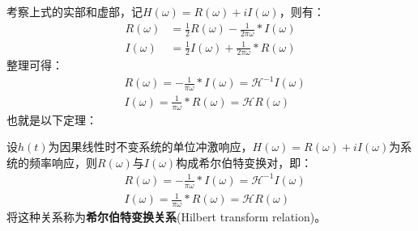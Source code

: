 考察上式的实部和虚部，记$H(\omega)=R(\omega)+iI(\omega)$，则有：
\begin{align*}
    R(\omega)&=\frac{1}{2}R(\omega)-\frac{1}{2\pi \omega}*I(\omega)\\
    I(\omega)&=\frac{1}{2}I(\omega)+\frac{1}{2\pi \omega}*R(\omega)
\end{align*}
整理可得：
\begin{align*}
    &R(\omega)=-\frac{1}{\pi \omega}*I(\omega)=\mathcal{H} ^{-1}I(\omega)\\
    &I(\omega)=\frac{1}{\pi \omega}*R(\omega)=\mathcal{H} R(\omega)
\end{align*}
也就是以下定理：
\begin{theorem}[希尔伯特变换关系]
    设$h(t)$为因果线性时不变系统的单位冲激响应，$H(\omega)=R(\omega)+iI(\omega)$为系统的频率响应，则$R(\omega)$与$I(\omega)$构成希尔伯特变换对，即：
    \begin{align*}
    &R(\omega)=-\frac{1}{\pi \omega}*I(\omega)=\mathcal{H} ^{-1}I(\omega)\\
    &I(\omega)=\frac{1}{\pi \omega}*R(\omega)=\mathcal{H} R(\omega)
\end{align*}
将这种关系称为\textbf{希尔伯特变换关系}(Hilbert transform relation)。
\end{theorem}

